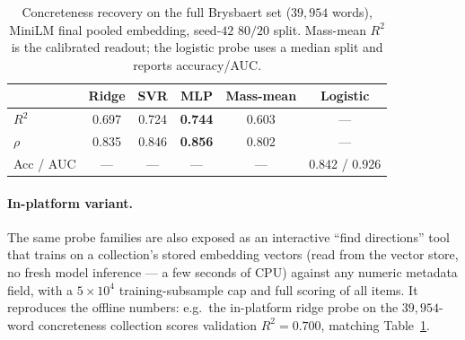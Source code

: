 \begin{table}[t]
  \centering
  \small
  \begin{tabular}{@{}lccccc@{}}
    \toprule
    & \textbf{Ridge} & \textbf{SVR} & \textbf{MLP} & \textbf{Mass-mean} & \textbf{Logistic} \\
    \midrule
    $R^2$        & 0.697 & 0.724 & \textbf{0.744} & 0.603 & --- \\
    $\rho$       & 0.835 & 0.846 & \textbf{0.856} & 0.802 & --- \\
    Acc / AUC    & ---   & ---   & ---   & ---   & 0.842 / 0.926 \\
    \bottomrule
  \end{tabular}
  \caption{Concreteness recovery on the full Brysbaert set ($39{,}954$ words),
  MiniLM final pooled embedding, seed-$42$ $80/20$ split. Mass-mean $R^2$ is the
  calibrated readout; the logistic probe uses a median split and reports
  accuracy/AUC.}
  \label{tab:conc-only}
\end{table}

\paragraph{In-platform variant.}
The same probe families are also exposed as an interactive ``find directions''
tool that trains on a collection's stored embedding vectors (read from the
vector store, no fresh model inference — a few seconds of CPU) against any
numeric metadata field, with a $5\times10^{4}$ training-subsample cap and full
scoring of all items. It reproduces the offline numbers: e.g.\ the in-platform
ridge probe on the $39{,}954$-word concreteness collection scores validation
$R^2=0.700$, matching Table~\ref{tab:conc-only}.
